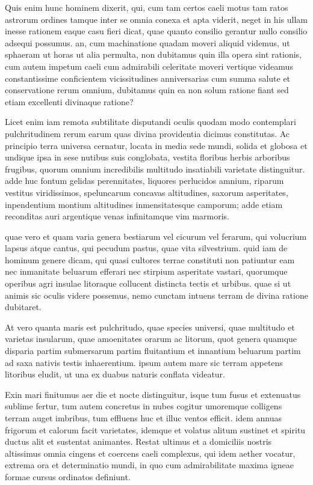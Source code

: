  Quis enim hunc hominem dixerit, qui, cum tam certos caeli motus tam ratos astrorum ordines tamque inter se omnia conexa et apta viderit, neget in his ullam inesse rationem eaque casu fieri dicat, quae quanto consilio gerantur nullo consilio adsequi possumus. an, cum machinatione quadam moveri aliquid videmus, ut sphaeram ut horas ut alia permulta, non dubitamus quin illa opera sint rationis, cum autem impetum caeli cum admirabili celeritate moveri vertique videamus constantissime conficientem vicissitudines anniversarias cum summa salute et conservatione rerum omnium, dubitamus quin ea non solum ratione fiant sed etiam excellenti divinaque ratione?

 Licet enim iam remota subtilitate disputandi oculis quodam modo contemplari pulchritudinem rerum earum quas divina providentia dicimus constitutas. Ac principio terra universa cernatur, locata in media sede mundi, solida et globosa et undique ipsa in sese nutibus suis conglobata, vestita floribus herbis arboribus frugibus, quorum omnium incredibilis multitudo insatiabili varietate distinguitur. adde huc fontum gelidas perennitates, liquores perlucidos amnium, riparum vestitus viridissimos, speluncarum concavas altitudines, saxorum asperitates, inpendentium montium altitudines inmensitatesque camporum; adde etiam reconditas auri argentique venas infinitamque vim marmoris.

 quae vero et quam varia genera bestiarum vel cicurum vel ferarum, qui volucrium lapsus atque cantus, qui pecudum pastus, quae vita silvestrium. quid iam de hominum genere dicam, qui quasi cultores terrae constituti non patiuntur eam nec inmanitate beluarum efferari nec stirpium asperitate vastari, quorumque operibus agri insulae litoraque collucent distincta tectis et urbibus. quae si ut animis sic oculis videre possemus, nemo cunctam intuens terram de divina ratione dubitaret.

 At vero quanta maris est pulchritudo, quae species universi, quae multitudo et varietas insularum, quae amoenitates orarum ac litorum, quot genera quamque disparia partim submersarum partim fluitantium et innantium beluarum partim ad saxa nativis testis inhaerentium. ipsum autem mare sic terram appetens litoribus eludit, ut una ex duabus naturis conflata videatur.

 Exin mari finitumus aer die et nocte distinguitur, isque tum fusus et extenuatus sublime fertur, tum autem concretus in nubes cogitur umoremque colligens terram auget imbribus, tum effluens huc et illuc ventos efficit. idem annuas frigorum et calorum facit varietates, idemque et volatus alitum sustinet et spiritu ductus alit et sustentat animantes. Restat ultimus et a domiciliis nostris altissimus omnia cingens et coercens caeli complexus, qui idem aether vocatur, extrema ora et determinatio mundi, in quo cum admirabilitate maxima igneae formae cursus ordinatos definiunt.

